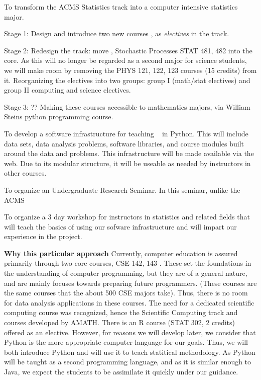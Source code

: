 \bit
\item To transform the ACMS Statistics track into a computer intensive statistics major. 
  \bit
   \item Stage 1: Design and introduce two new courses \statcl, \astrocl as {\em electives} in the track.
   \item Stage 2: Redesign the track: move \statcl, Stochastic Processes STAT 481, 482 into the core. As this will no longer be regarded as a second major for science students, we will make room by removing the PHYS 121, 122, 123 courses (15 credits) from it. Reorganizing the electives into two groups: group I (math/stat electives) and group II computing and science electives. 
   \item Stage 3: ?? Making these courses accessible to mathematics majors, via William Steins python programming course. 
  \eit
\item To develop a software infrastructure for teaching \cdse~ in
  Python. This will include data sets, data analysis problems,
  software libraries, and course modules built around the data and
  problems. This infrastructure will be made available via the
  web. Due to its modular structure, it will be useable as needed by
  instructors in other courses.
\item To organize an Undergraduate Research Seminar. In this seminar, unlike the ACMS 
\item To organize a 3 day workshop for instructors in statistics and related fields that will teach the basics of using our sofware infrastructure and will impart our experience in the project.
\eit



{\bf Why this particular approach} Currently, computer education is
assured primarily through two core courses, CSE 142, 143
\cite{cse142}. These set the foundations in the understanding of
computer programming, but they are of a general nature, and are mainly
focuses towards preparing future programmers. (These courses are the
same courses that the about 500 CSE majors take). Thus, there is no
room for data analysis applications in these courses. The need for a
dedicated scientific computing course was recognized, hence the
Scientific Computing track and courses developed by AMATH. There is an
R course (STAT 302, 2 credits) offered as an elective. However, for
reasons we will develop later, we consider that Python is the more
appropriate computer language for our goals. Thus, we will both
introduce Python and will use it to teach statitical methodology. As
Python will be taught as a second programming language, and as it is
similar enough to Java, we expect the students to be assimilate it
quickly under our guidance. 

